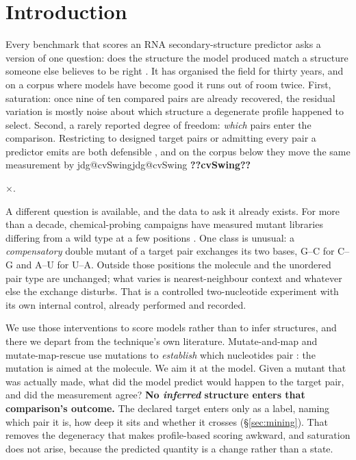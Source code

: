 \documentclass[11pt]{article}
\makeatletter
\newcommand{\jdg}[1]{%
  \ifcsname jdg@#1\endcsname\csname jdg@#1\endcsname
  \else\textbf{??#1??}\PackageError{nm}{undefined measured quantity #1}{}\fi}
\makeatother
\begin{document}

\section{Introduction}
\label{sec:intro}

Every benchmark that scores an RNA secondary-structure predictor asks a version of one question:
does the structure the model produced match a structure someone else believes to be right
\citep{mathews2004incorporating,hajdin2013accurate,waymentsteele2022rna}. It has organised the
field for thirty years, and on a corpus where models have become good it runs out of room twice.
First, saturation: once nine of ten compared pairs are already recovered, the residual variation is
mostly noise about which structure a degenerate profile happened to select. Second, a rarely
reported degree of freedom: \emph{which} pairs enter the comparison. Restricting to designed target
pairs or admitting every pair a predictor emits are both defensible \citep{mathews2019benchmark},
and on the corpus below they move the same measurement by \jdg{cvSwing}$\times$.

A different question is available, and the data to ask it already exists. For more than a decade,
chemical-probing campaigns have measured mutant libraries differing from a wild type at a few
positions \citep{kladwang2011two,cordero2015rich,tian2014correcting}. One class is unusual: a
\emph{compensatory} double mutant of a target pair exchanges its two bases, G--C for C--G and A--U
for U--A. Outside those positions the molecule and the unordered pair type are unchanged; what
varies is nearest-neighbour context and whatever else the exchange disturbs. That is a
controlled two-nucleotide experiment with its own internal control, already performed and
recorded.

We use those interventions to score models rather than to infer structures, and there we depart
from the technique's own literature. Mutate-and-map and mutate-map-rescue use mutations to
\emph{establish} which nucleotides pair \citep{kladwang2011two,tian2014correcting,cheng2017rna}:
the mutation is aimed at the molecule. We aim it at the model. Given a mutant that was actually
made, what did the model predict would happen to the target pair, and did the measurement agree?
\textbf{No \emph{inferred} structure enters that comparison's outcome.} The declared target enters only
as a label, naming which pair it is, how deep it sits and whether it crosses (\S\ref{sec:mining}).
That removes the degeneracy that makes profile-based scoring awkward, and saturation does not
arise, because the predicted quantity is a change rather than a state.
\end{document}
